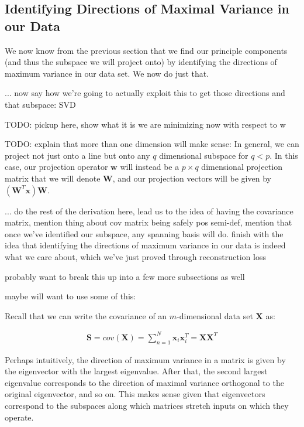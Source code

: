 \subsection{Identifying Directions of Maximal Variance in our Data}
We now know from the previous section that we find our principle components (and thus the subspace we will project onto) by identifying the directions of maximum variance in our data set. We now do just that.



... now say how we're going to actually exploit this to get those directions and that subspace: SVD


\newpage

TODO: pickup here, show what it is we are minimizing now with respect to w


TODO: explain that more than one dimension will make sense:
In general, we can project not just onto a line but onto any $q$ dimensional subspace for $q < p$. In this case, our projection operator $\textbf{w}$ will instead be a $p \times q$ dimensional projection matrix that we will denote $\textbf{W}$, and our projection vectors will be given by $(\textbf{W}^{T}\textbf{x})\textbf{W}$.

... do the rest of the derivation here, lead us to the idea of having the covariance matrix, mention thing about cov matrix being safely pos semi-def, mention that once we've identified our subspace, any spanning basis will do. finish with the idea that identifying the directions of maximum variance in our data is indeed what we care about, which we've just proved through reconstruction loss

probably want to break this up into a few more subsections as well

maybe will want to use some of this:

Recall that we can write the covariance of an $m$-dimensional data set $\textbf{X}$ as:

\begin{align*}
	\textbf{S} = cov(\textbf{X}) = \sum_{n=1}^{N} \textbf{x}_{i} \textbf{x}_{i}^{T} = \textbf{X}\textbf{X}^{T}
\end{align*}


Perhaps intuitively, the direction of maximum variance in a matrix is given by the eigenvector with the largest eigenvalue. After that, the second largest eigenvalue corresponds to the direction of maximal variance orthogonal to the original eigenvector, and so on. This makes sense given that eigenvectors correspond to the subspaces along which matrices stretch inputs on which they operate.

